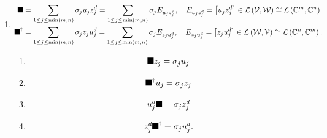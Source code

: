 \documentclass[aps,preprint]{revtex4}%
\providecommand{\U}[1]{\protect\rule{.1in}{.1in}}
\begin{document}
\begin{enumerate}
\item
\begin{align}
\U{3a3}  &  =\sum_{1\leq j\leq\min\left(  m,n\right)  }\sigma_{j}u_{j}%
z_{j}^{d}=\sum_{1\leq j\leq\min\left(  m,n\right)  }\sigma_{j}E_{u_{j}%
z_{j}^{d}},\quad E_{u_{j}z_{j}^{d}}=\left[  u_{j}z_{j}^{d}\right]
\in\mathcal{L}\left(  \mathcal{V},\mathcal{W}\right)  \cong\mathcal{L}\left(
\mathbb{C}^{m},\mathbb{C}^{n}\right) \\
\U{3a3} ^{\dagger}  &  =\sum_{1\leq j\leq\min\left(  m,n\right)  }\sigma
_{j}z_{j}u_{j}^{d}=\sum_{1\leq j\leq\min\left(  m,n\right)  }\sigma
_{j}E_{z_{j}u_{j}^{d}},\quad E_{z_{j}u_{j}^{d}}=\left[  z_{j}u_{j}^{d}\right]
\in\mathcal{L}\left(  \mathcal{W},\mathcal{V}\right)  \cong\mathcal{L}\left(
\mathbb{C}^{n},\mathbb{C}^{m}\right)  .
\end{align}


\begin{enumerate}
\item
\begin{equation}
\U{3a3} z_{j}=\sigma_{j}u_{j}%
\end{equation}


\item
\begin{equation}
\U{3a3} ^{\dagger}u_{j}=\sigma_{j}z_{j}%
\end{equation}


\item
\begin{equation}
u_{j}^{d}\U{3a3} =\sigma_{j}z_{j}^{d}%
\end{equation}


\item
\begin{equation}
z_{j}^{d}\U{3a3} ^{\dagger}=\sigma_{j}u_{j}^{d}.
\end{equation}

\end{enumerate}
\end{enumerate}
\end{document}
